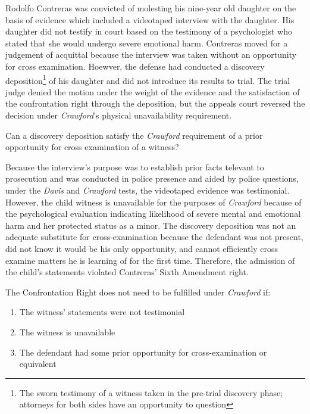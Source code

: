 \documentclass[paper=letter,fontsize=10pt]{article}
\newcommand{\case}[3]{\noindent {\large\textbf{\textit{#1}, #2 (#3)}} \par}
\begin{document}
	\begin{description}[align=right]
		\item[Facts] \noindent
			Rodolfo Contreras was convicted of molesting his nine-year old daughter on the basis of evidence which included a videotaped interview with the daughter.
			His daughter did not testify in court based on the testimony of a psychologist who stated that she would undergo severe emotional harm.
			Contreras moved for a judgement of acquittal because the interview was taken without an opportunity for cross examination.
			Hoewver, the defense had conducted a discovery deposition\footnote{The sworn testimony of a witness taken in the pre-trial discovery phase; attorneys for both sides have an opportunity to question} of his daughter and did not introduce its results to trial. 
			The trial judge denied the motion under the weight of the evidence and the satisfaction of the confrontation right through the deposition, but the appeals court reversed the decision under \textit{Crawford}’s physical unavailability requirement.
		\item[Issue] \noindent
			Can a discovery deposition satisfy the \textit{Crawford} requirement of a prior opportunity for cross examination of a witness?
		\item[Holding] \noindent 
			Because the interview’s purpose was to establish prior facts televant to prosecution and was conducted in police presence and aided by police questions, under the \textit{Davis}  and \textit{Crawford} tests, the videotaped evidence was testimonial.
			However, the child witness is unavailable for the purposes of \textit{Crawford} because of the psychological evaluation indicating likelihood of severe mental and emotional harm and her protected status as a minor.
			The discovery deposition was not an adequate substitute for cross-examination because the defendant was not present, did not know it would be his only opportunity, and cannot efficiently cross examine matters he is learning of for the first time.
			Therefore, the admission of the child’s statements violated Contreras’ Sixth Amendment right.
		\item[Rules] \noindent
			The Confrontation Right does not need to be fulfilled under \textit{Crawford} if:
			\begin{enumerate}
				\item The witness’ statements were not testimonial
				\item The witness is unavailable
				\item The defendant had some prior opportunity for cross-examination or equivalent
			\end{enumerate}
	\end{description}
\case{Seely v. State}{282 S.W. 3d 778}{Ark. 2008}
	\begin{description}[align=right]
		\item[Facts] \noindent
		\item[Issue] \noindent
		\item[Holding] \noindent 
		\item[Concurrence] \noindent
		\item[Dissent] \noindent
		\item[Rules] \noindent
	\end{description}
\end{document}
